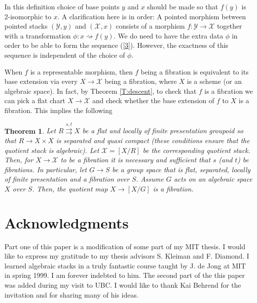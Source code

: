 \documentclass{amsart}
\newtheorem{thm}{Theorem}[section]
\theoremstyle{definition}
\theoremstyle{remark}
\theoremstyle{remark}
\newcommand{\X}{\mathcal{X}}
\newcommand{\Y}{\mathcal{Y}}
\newcommand{\rsa}{\rightsquigarrow}
\newcommand{\x}{\times}
\newcommand{\st}[1]{\stackrel{#1}{\rightrightarrows}}
\let\:=\colon
\begin{document}
In this definition choice of base points $y$ and $x$ should be
made so that $f(y)$ is 2-isomorphic to $x$. A clarification here
is in order: A pointed morphism between pointed stacks $(\Y,y)$
and $(\X,x)$ consists of a morphism $f \:\Y \to \X$ together with
a transformation $\phi \: x \rsa f(y)$. We do need to have the
extra data $\phi$ in order to be able to form the sequence
(\ref{3}). However, the exactness of this sequence is independent
of the choice of $\phi$.

When $f$ is a representable morphism, then $f$ being a fibration
is equivalent to its base extension via every $X \to \X$ being a
fibration, where $X$ is a scheme (or an algebraic space). In fact,
by Theorem \ref{T:descent}, to check that $f$ is a fibration we
can pick a flat chart $X \to \X$ and check whether the base
extension of $f$ to $X$ is a fibration. This implies the following

\begin{thm}{\label{T:last}}
Let $R \st{s,t} X$ be a flat and locally of finite presentation
 groupoid so that $R \to X \x X$ is separated and quasi compact
 (these conditions ensure that the
 quotient stack is algebraic).
 Let $\X=[X/R]$ be the corresponding quotient stack. Then, for $X \to \X$ to be a fibration it
 is necessary and sufficient that $s$ (and $t$) be fibrations. In particular, let $G \to S$ be a  group space
 that is flat, separated, locally of finite presentation and a fibration over $S$.
 Assume $G$ acts on an algebraic space $X$ over $S$. Then, the quotient map $X \to [X/G]$ is a fibration.
 \end{thm}

\section*{Acknowledgments}
Part one of this paper is a modification of some part of my MIT
thesis. I would like to express my gratitude to my thesis advisors
S. Kleiman and F. Diamond. I learned algebraic stacks in a truly
fantastic course taught by J. de Jong at MIT in spring 1999. I am
forever indebted to him. The second part of the this paper was
added during my visit to UBC. I would like to thank Kai Behrend
for the invitation and for sharing many of his ideas.



\end{document}
